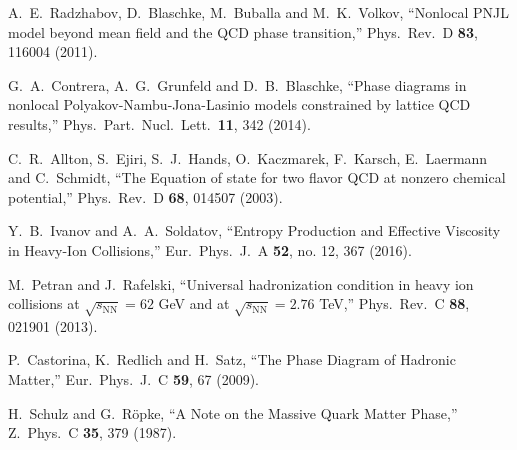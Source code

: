 \documentclass{webofc}
\begin{document}
\begin{thebibliography}{}
  A.~E.~Radzhabov, D.~Blaschke, M.~Buballa and M.~K.~Volkov,
  ``Nonlocal PNJL model beyond mean field and the QCD phase transition,''
  Phys.\ Rev.\ D {\bf 83}, 116004 (2011).

  G.~A.~Contrera, A.~G.~Grunfeld and D.~B.~Blaschke,
  ``Phase diagrams in nonlocal Polyakov-Nambu-Jona-Lasinio models constrained by lattice QCD results,''
  Phys.\ Part.\ Nucl.\ Lett.\  {\bf 11}, 342 (2014).
 
  C.~R.~Allton, S.~Ejiri, S.~J.~Hands, O.~Kaczmarek, F.~Karsch, E.~Laermann and C.~Schmidt,
  ``The Equation of state for two flavor QCD at nonzero chemical potential,''
  Phys.\ Rev.\ D {\bf 68}, 014507 (2003).

  Y.~B.~Ivanov and A.~A.~Soldatov,
  ``Entropy Production and Effective Viscosity in Heavy-Ion Collisions,''
  Eur.\ Phys.\ J.\ A {\bf 52}, no. 12, 367 (2016).
  
  M.~Petran and J.~Rafelski,
  ``Universal hadronization condition in heavy ion collisions at $\sqrt{s_\mathrm{NN}}= 62$ GeV and at $\sqrt{s_\mathrm{NN}}=2.76$ TeV,''
  Phys.\ Rev.\ C {\bf 88}, 021901 (2013).
  
  P.~Castorina, K.~Redlich and H.~Satz,
  ``The Phase Diagram of Hadronic Matter,''
  Eur.\ Phys.\ J.\ C {\bf 59}, 67 (2009).

  H.~Schulz and G.~R\"opke,
  ``A Note on the Massive Quark Matter Phase,''
  Z.\ Phys.\ C {\bf 35}, 379 (1987).


\end{thebibliography}
\end{document}
